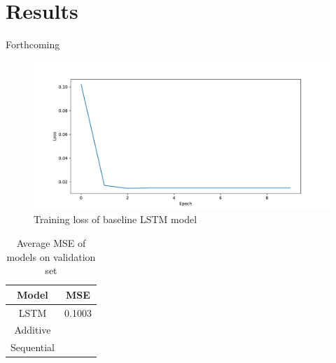 \section{Results}

Forthcoming

\begin{figure}[H]
	\centering
	\includegraphics[width=\linewidth]{../../figures/vanilla_lstm_training_loss.pdf}
	\caption{Training loss of baseline LSTM model}
	\label{fig:lstm_loss}
\end{figure}

\begin{table}[H]
	\centering
	\begin{tabular}{|c|c|}
	\hline
	Model & MSE \\
	\hline
	LSTM & 0.1003 \\
	Additive & \\
	Sequential & \\
	\hline
	\end{tabular}
	\caption{Average MSE of models on validation set}
	\label{tab:results_summary}
\end{table}